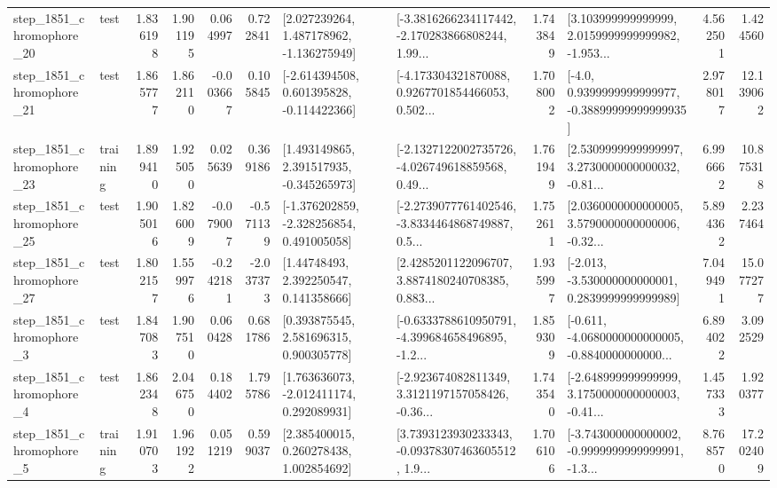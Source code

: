 \begin{tabular}{llrrrrllrlrr}
 step\_1851\_chromophore\_20 &      test &      1.836198 &    1.901195 &      0.064997 &  0.722841 &    [2.027239264, 1.487178962, -1.136275949] &  [-3.3816266234117442, -2.170283866808244, 1.99... &       1.743849 &  [3.103999999999999, 2.0159999999999982, -1.953... &            4.562501 &          1.424560 \\
 step\_1851\_chromophore\_21 &      test &      1.865777 &    1.862110 &     -0.003667 &  0.105845 &   [-2.614394508, 0.601395828, -0.114422366] &  [-4.173304321870088, 0.9267701854466053, 0.502... &       1.708002 &   [-4.0, 0.9399999999999977, -0.38899999999999935] &            2.978017 &         12.139062 \\
 step\_1851\_chromophore\_23 &  training &      1.899410 &    1.925050 &      0.025639 &  0.369186 &    [1.493149865, 2.391517935, -0.345265973] &  [-2.1327122002735726, -4.026749618859568, 0.49... &       1.761949 &  [2.5309999999999997, 3.2730000000000032, -0.81... &            6.996662 &         10.875318 \\
 step\_1851\_chromophore\_25 &      test &      1.905016 &    1.826009 &     -0.079007 & -0.571139 &   [-1.376202859, -2.328256854, 0.491005058] &  [-2.2739077761402546, -3.8334464868749887, 0.5... &       1.752611 &  [2.0360000000000005, 3.5790000000000006, -0.32... &            5.894362 &          2.237464 \\
 step\_1851\_chromophore\_27 &      test &      1.802157 &    1.559976 &     -0.242181 & -2.037373 &      [1.44748493, 2.392250547, 0.141358666] &  [2.4285201122096707, 3.8874180240708385, 0.883... &       1.935997 &   [-2.013, -3.530000000000001, 0.2839999999999989] &            7.049491 &         15.077277 \\
  step\_1851\_chromophore\_3 &      test &      1.847083 &    1.907510 &      0.060428 &  0.681786 &     [0.393875545, 2.581696315, 0.900305778] &  [-0.6333788610950791, -4.399684658496895, -1.2... &       1.859309 &  [-0.611, -4.0680000000000005, -0.8840000000000... &            6.894022 &          3.092529 \\
  step\_1851\_chromophore\_4 &      test &      1.862348 &    2.046750 &      0.184402 &  1.795786 &    [1.763636073, -2.012411174, 0.292089931] &  [-2.923674082811349, 3.3121197157058426, -0.36... &       1.743540 &  [-2.648999999999999, 3.1750000000000003, -0.41... &            1.457333 &          1.920377 \\
  step\_1851\_chromophore\_5 &  training &      1.910703 &    1.961922 &      0.051219 &  0.599037 &     [2.385400015, 0.260278438, 1.002854692] &  [3.7393123930233343, -0.09378307463605512, 1.9... &       1.706106 &  [-3.743000000000002, -0.9999999999999991, -1.3... &            8.768570 &         17.202409 \\

\end{tabular}
